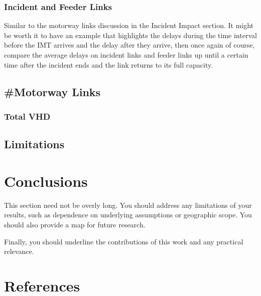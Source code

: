 \documentclass[
  letterpaper,
  authoryear]{elsarticle}
\begin{document}
\hypertarget{incident-and-feeder-links}{%
\subsubsection{Incident and Feeder
Links}\label{incident-and-feeder-links}}

Similar to the motorway links discussion in the Incident Impact section.
It might be worth it to have an example that highlights the delays
during the time interval before the IMT arrives and the delay after they
arrive, then once again of course, compare the average delays on
incident links and feeder links up until a certain time after the
incident ends and the link returns to its full capacity.

\hypertarget{motorway-links-1}{%
\subsection{\#Motorway Links}\label{motorway-links-1}}

\hypertarget{total-vhd-1}{%
\subsubsection{Total VHD}\label{total-vhd-1}}

\hypertarget{limitations}{%
\subsection{Limitations}\label{limitations}}


\hypertarget{conclusions}{%
\section{Conclusions}\label{conclusions}}

This section need not be overly long. You should address any limitations
of your results, such as dependence on underlying assumptions or
geographic scope. You should also provide a map for future research.

Finally, you should underline the contributions of this work and any
practical relevance.


\hypertarget{references}{%
\section*{References}\label{references}}


\renewcommand{\bibsection}{}

\end{document}
